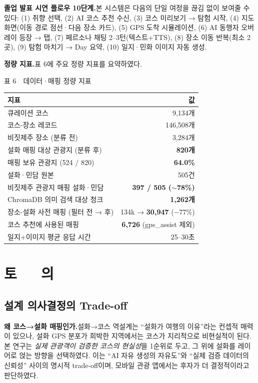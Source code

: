 \documentclass[10pt,twocolumn,a4paper]{article}
\begin{document}
\textbf{졸업 발표 시연 플로우 10단계.}\quad 본 시스템은 다음의 단일 여정을
끊김 없이 보여줄 수 있다:
(1) 취향 선택,
(2) AI 코스 추천 수신,
(3) 코스 미리보기 → 탐험 시작,
(4) 지도 화면(이동 경로 점선·다음 장소 카드),
(5) GPS 도착 시뮬레이션,
(6) AI 동행자 오버레이 등장 → 탭,
(7) 페르소나 채팅 2--3턴(텍스트+TTS),
(8) 장소 이동 반복(최소 2곳),
(9) 탐험 마치기 → Day 요약,
(10) 일지·민화 이미지 자동 생성.

\textbf{정량 지표.}\quad 표 6에 주요 정량 지표를 요약하였다.

\begin{table}[H]
\centering
{\small 표 6~~데이터·매핑 정량 지표}
\label{tab:metric}
\vspace{2pt}

\footnotesize
\begin{tabularx}{\columnwidth}{Xr}
\toprule
지표 & 값 \\
\midrule
큐레이션 코스 & 9{,}134개 \\
코스-장소 레코드 & 146{,}508개 \\
비짓제주 장소 (분류 전) & 3{,}284개 \\
설화 매핑 대상 관광지 (분류 후) & \textbf{820개} \\
매핑 보유 관광지 (524 / 820) & \textbf{64.0\%} \\
설화·민담 원본 & 505건 \\
비짓제주 관광지 매핑 설화·민담 & \textbf{397 / 505 ($\sim$78\%)} \\
ChromaDB 의미 검색 대상 청크 & \textbf{1{,}262개} \\
장소-설화 사전 매핑 (필터 전 → 후) & 134k → \textbf{30{,}947} ($-77\%$) \\
코스 추천에 사용된 매핑 & \textbf{6{,}726} (gps\_assist 제외) \\
일지+이미지 평균 응답 시간 & 25--30초 \\
\bottomrule
\end{tabularx}
\end{table}

\section{토~~~의}

\subsection{설계 의사결정의 Trade-off}

\textbf{왜 코스→설화 매핑인가.}\quad 설화→코스 역설계는 ``설화가 여행의
이유''라는 컨셉적 매력이 있으나, 설화 GPS 분포가 희박한 지역에서는 코스가
지리적으로 비현실적이 된다. 본 연구는 \emph{실제 관광객이 검증한 코스의
현실성}을 1순위로 두고, 그 위에 설화를 레이어로 얹는 방향을 선택하였다.
이는 ``AI 자유 생성의 자유도''와 ``실제 검증 데이터의 신뢰성'' 사이의 명시적
trade-off이며, 모바일 관광 앱에서는 후자가 더 결정적이라고 판단하였다.
\end{document}
